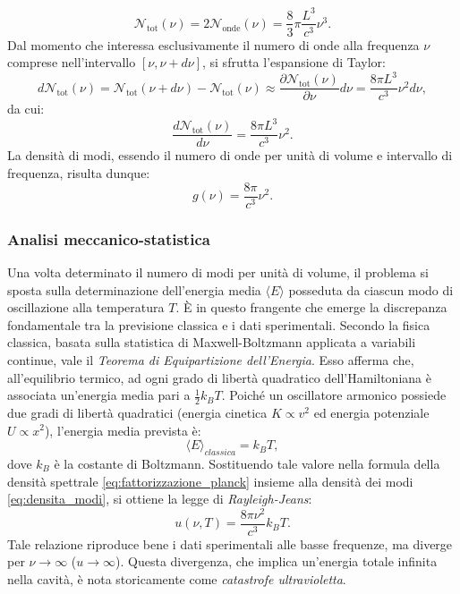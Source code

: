 \documentclass[a4paper,11pt]{report}
\begin{document}
\begin{equation}
\mathcal{N}_{\text{tot}}(\nu) = 2\mathcal{N}_{\text{onde}}(\nu) = \frac{8}{3}\pi \frac{L^3}{c^3}\nu^3.
\end{equation}
Dal momento che interessa esclusivamente il numero di onde alla frequenza $\nu$ comprese nell'intervallo $[\nu, \nu+d\nu]$, si sfrutta l'espansione di Taylor:
\begin{equation}
d\mathcal{N}_{\text{tot}}(\nu) =  \mathcal{N}_{\text{tot}}(\nu+d\nu) - \mathcal{N}_{\text{tot}}(\nu) \approx \frac{\partial \mathcal{N}_{\text{tot}}(\nu)}{\partial \nu}d\nu = \frac{8\pi L^3}{c^3}\nu^2 d\nu,
\end{equation}
da cui:
\begin{equation}
\frac{d\mathcal{N}_{\text{tot}}(\nu)}{d\nu} = \frac{8\pi L^3}{c^3}\nu^2.
\label{eq:densita_modi}
\end{equation}
La densità di modi, essendo il numero di onde per unità di volume e intervallo di frequenza, risulta dunque:
\begin{equation}
g(\nu) = \frac{8\pi}{c^3}\nu^2.
\end{equation}



\subsubsection{Analisi meccanico-statistica}
Una volta determinato il numero di modi per unità di volume, il problema si sposta sulla determinazione dell'energia media $\langle E \rangle$ posseduta da ciascun modo di oscillazione alla temperatura $T$. È in questo frangente che emerge la discrepanza fondamentale tra la previsione classica e i dati sperimentali.
Secondo la fisica classica, basata sulla statistica di Maxwell-Boltzmann applicata a variabili continue, vale il \textit{Teorema di Equipartizione dell'Energia}. Esso afferma che, all'equilibrio termico, ad ogni grado di libertà quadratico dell'Hamiltoniana è associata un'energia media pari a $\frac{1}{2}k_B T$.
Poiché un oscillatore armonico possiede due gradi di libertà quadratici (energia cinetica $K \propto v^2$ ed energia potenziale $U \propto x^2$), l'energia media prevista è:
\begin{equation}
    \langle E \rangle_{classica} = k_B T,
\end{equation}
dove $k_B$ è la costante di Boltzmann.
Sostituendo tale valore nella formula della densità spettrale \eqref{eq:fattorizzazione_planck} insieme alla densità dei modi \eqref{eq:densita_modi}, si ottiene la legge di \textit{Rayleigh-Jeans}:
\begin{equation}
    u(\nu, T) = \frac{8\pi \nu^2}{c^3} k_B T.
\end{equation}
Tale relazione riproduce bene i dati sperimentali alle basse frequenze, ma diverge per $\nu \to \infty$ ($u \to \infty$). Questa divergenza, che implica un'energia totale infinita nella cavità, è nota storicamente come \textit{catastrofe ultravioletta}.
\end{document}
